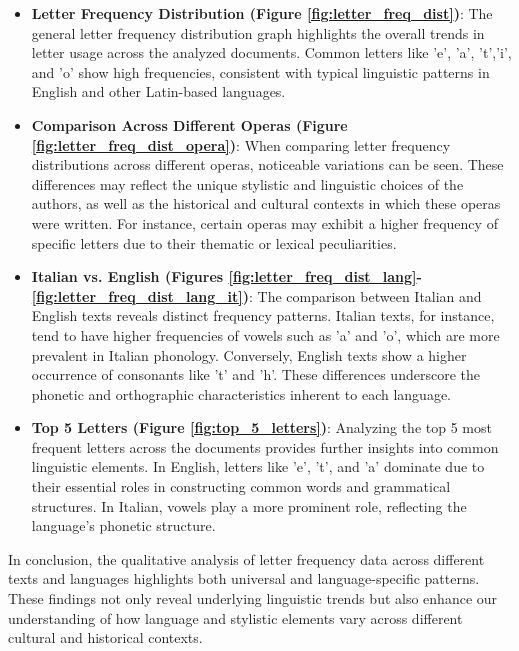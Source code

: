 \begin{itemize}
\item \textbf{Letter Frequency Distribution (Figure \ref{fig:letter_freq_dist})}: The general letter frequency distribution graph highlights the overall trends in letter usage across the analyzed documents. Common letters like 'e', 'a', 't','i', and 'o' show high frequencies, consistent with typical linguistic patterns in English and other Latin-based languages.

\item \textbf{Comparison Across Different Operas (Figure \ref{fig:letter_freq_dist_opera})}: When comparing letter frequency distributions across different operas, noticeable variations can be seen. These differences may reflect the unique stylistic and linguistic choices of the authors, as well as the historical and cultural contexts in which these operas were written. For instance, certain operas may exhibit a higher frequency of specific letters due to their thematic or lexical peculiarities.

\item \textbf{Italian vs. English (Figures \ref{fig:letter_freq_dist_lang}-\ref{fig:letter_freq_dist_lang_it})}: The comparison between Italian and English texts reveals distinct frequency patterns. Italian texts, for instance, tend to have higher frequencies of vowels such as 'a' and 'o', which are more prevalent in Italian phonology. Conversely, English texts show a higher occurrence of consonants like 't' and 'h'. These differences underscore the phonetic and orthographic characteristics inherent to each language.

\item \textbf{Top 5 Letters (Figure \ref{fig:top_5_letters})}: Analyzing the top 5 most frequent letters across the documents provides further insights into common linguistic elements. In English, letters like 'e', 't', and 'a' dominate due to their essential roles in constructing common words and grammatical structures. In Italian, vowels play a more prominent role, reflecting the language's phonetic structure.

\end{itemize}

\noindent In conclusion, the qualitative analysis of letter frequency data across different texts and languages highlights both universal and language-specific patterns. These findings not only reveal underlying linguistic trends but also enhance our understanding of how language and stylistic elements vary across different cultural and historical contexts.
